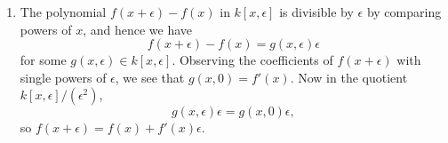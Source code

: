 \documentclass{report}
\begin{document}
\begin{enumerate}[label=\textbf{3.2.\Alph*.}]
	\item The polynomial $f(x+\epsilon)-f(x)$ in $k[x,\epsilon]$ is divisible by
	      $\epsilon$ by comparing powers of $x$, and hence we have
	      \begin{equation*}
		      f(x+\epsilon)-f(x) = g(x,\epsilon)\epsilon
	      \end{equation*}
	      for some $g(x,\epsilon)\in k[x,\epsilon]$. Observing the coefficients of
	      $f(x+\epsilon)$ with single powers of $\epsilon$, we see that
	      $g(x,0)=f'(x)$. Now in the quotient $k[x,\epsilon]/(\epsilon^2)$,
	      \begin{equation*}
		      g(x,\epsilon)\epsilon = g(x,0)\epsilon,
	      \end{equation*}
	      so $f(x+\epsilon)=f(x)+f'(x)\epsilon$.
\end{enumerate}
\end{document}
